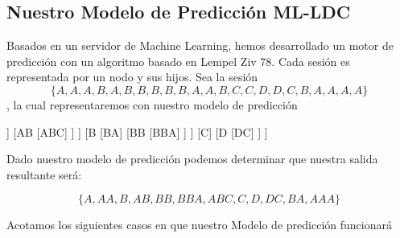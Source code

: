 \subsection{Nuestro Modelo de Predicción ML-LDC}






Basados en un servidor de Machine Learning, hemos desarrollado un motor de predicción con un algoritmo basado en Lempel Ziv 78. Cada sesión es representada por un nodo y sus hijos. Sea la sesión \begin{equation}
\{ A,A,A,B,A,B,B,B,B,B,A,A,B,C,C,D,D,C,B,A,A,A,A \}
\end{equation}, la cual representaremos con nuestro modelo de predicción


	\begin{forest} 
	[ $\epsilon$
		[A
			[AA
				[AAA]	
			]
			[AB
				[ABC]
			]
		]
		[B
			[BA]
			[BB
				[BBA]
			]
		]
		[C]
		[D
			[DC]
		]
	]
	\end{forest}

Dado nuestro modelo de predicción podemos determinar que nuestra salida resultante será:

\begin{equation}
\{ A,AA,B,AB,BB,BBA,ABC,C,D,DC,BA,AAA \}
\end{equation}


Acotamos los siguientes casos en que nuestro Modelo de predicción funcionará



